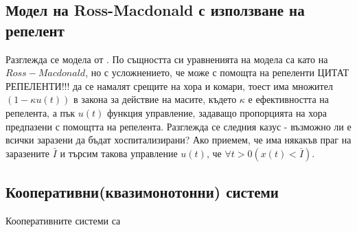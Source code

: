 \subsection{Модел на Ross-Macdonald с използване на репелент}
Разглежда се модела от \cite{Rashkov2019}. По същността си уравненията на модела са като на $Ross-Macdonald$, но с усложнението, че може с помощта на репеленти \color{Red} ЦИТАТ РЕПЕЛЕНТИ!!!
\color{Black} да се намалят срещите на хора и комари, тоест има множител $(1 - \kappa u(t))$ в закона за действие на масите, където $\kappa$ е ефективността на репелента, а пък $u(t)$ функция управление, задаващо пропорцията на хора предпазени с помощтта на репелента.
Разглежда се следния казус - възможно ли е всички заразени да бъдат хоспитализирани? Ако приемем, че има някакъв праг на заразените $\bar{I}$ и търсим такова управление $u(t)$, че $\forall t>0 (x(t) < \bar{I})$.

\subsection{Кооперативни(квазимонотонни) системи}
Кооперативните системи са
\cite{Capasso2008}
